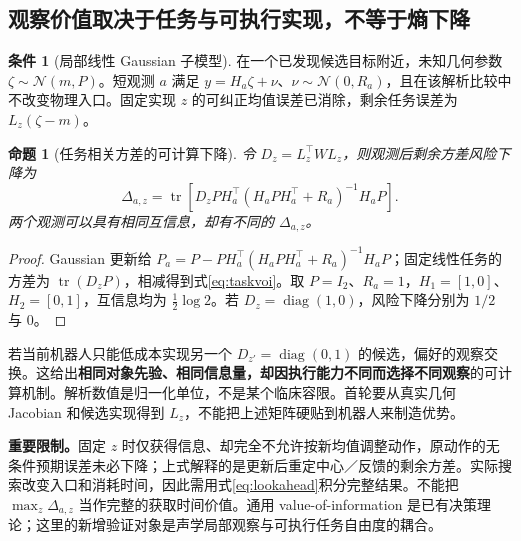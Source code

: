\documentclass[UTF8,fontset=fandol,11pt,a4paper]{ctexart}
\theoremstyle{plain}
\newtheorem{proposition}[theorem]{命题}
\theoremstyle{definition}
\newtheorem{assumption}[theorem]{条件}
\theoremstyle{remark}
\numberwithin{equation}{section}
\DeclareMathOperator{\tr}{tr}
\DeclareMathOperator{\diag}{diag}
\begin{document}
\subsection{观察价值取决于任务与可执行实现，不等于熵下降}
\begin{assumption}[局部线性 Gaussian 子模型]
在一个已发现候选目标附近，未知几何参数 $\zeta\sim\mathcal N(m,P)$。短观测 $a$ 满足 $y=H_a\zeta+\nu$、$\nu\sim\mathcal N(0,R_a)$，且在该解析比较中不改变物理入口。固定实现 $z$ 的可纠正均值误差已消除，剩余任务误差为 $L_z(\zeta-m)$。
\end{assumption}
\begin{proposition}[任务相关方差的可计算下降]
令 $D_z=L_z^\top WL_z$，则观测后剩余方差风险下降为
\begin{equation}
 \Delta_{a,z}=\tr\left[D_zPH_a^\top(H_aPH_a^\top+R_a)^{-1}H_aP\right].
 \label{eq:taskvoi}
\end{equation}
两个观测可以具有相同互信息，却有不同的 $\Delta_{a,z}$。
\end{proposition}
\begin{proof}
Gaussian 更新给 $P_a=P-PH_a^\top(H_aPH_a^\top+R_a)^{-1}H_aP$；固定线性任务的方差为 $\tr(D_zP)$，相减得到式\eqref{eq:taskvoi}。取 $P=I_2$、$R_a=1$，$H_1=[1,0]$、$H_2=[0,1]$，互信息均为 $\frac12\log 2$。若 $D_z=\diag(1,0)$，风险下降分别为 $1/2$ 与 $0$。
\end{proof}

若当前机器人只能低成本实现另一个 $D_{z'}=\diag(0,1)$ 的候选，偏好的观察交换。这给出\textbf{相同对象先验、相同信息量，却因执行能力不同而选择不同观察}的可计算机制。解析数值是归一化单位，不是某个临床容限。首轮要从真实几何 Jacobian 和候选实现得到 $L_z$，不能把上述矩阵硬贴到机器人来制造优势。

\textbf{重要限制。}固定 $z$ 时仅获得信息、却完全不允许按新均值调整动作，原动作的无条件预期误差未必下降；上式解释的是更新后重定中心／反馈的剩余方差。实际搜索改变入口和消耗时间，因此需用式\eqref{eq:lookahead}积分完整结果。不能把 $\max_z\Delta_{a,z}$ 当作完整的获取时间价值。通用 value-of-information 是已有决策理论；这里的新增验证对象是声学局部观察与可执行任务自由度的耦合。
\end{document}

